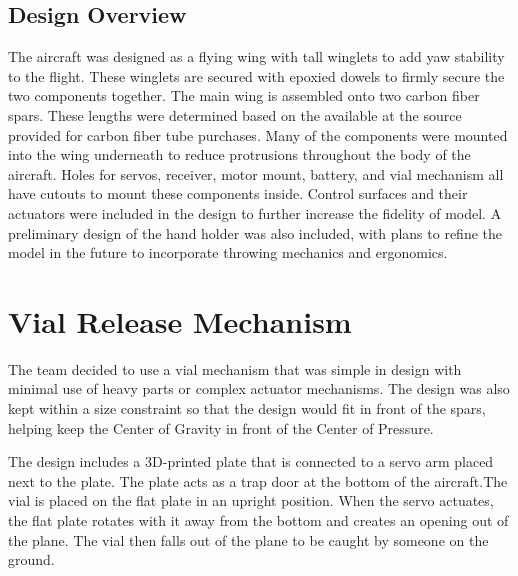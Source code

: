     
    \subsection{Design Overview}
    
        The aircraft was designed as a flying wing with tall winglets to add yaw stability to the flight. These winglets are secured with epoxied dowels to firmly secure the two components together. The main wing is assembled onto two carbon fiber spars. These lengths were determined based on the available at the source provided for carbon fiber tube purchases. Many of the components were mounted into the wing underneath to reduce protrusions throughout the body of the aircraft. Holes for servos, receiver, motor mount, battery, and vial mechanism all have cutouts to mount these components inside. Control surfaces and their actuators were included in the design to further increase the fidelity of model. A preliminary design of the hand holder was also included, with plans to refine the model in the future to incorporate throwing mechanics and ergonomics.

\section{Vial Release Mechanism}

    The team decided to use a vial mechanism that was simple in design with minimal use of heavy parts or complex actuator mechanisms. The design was also kept within a size constraint so that the design would fit in front of the spars, helping keep the Center of Gravity in front of the Center of Pressure. 
    
    The design includes a 3D-printed plate that is connected to a servo arm placed next to the plate. The plate acts as a trap door at the bottom of the aircraft.The vial is placed on the flat plate in an upright position. When the servo actuates, the flat plate rotates with it away from the bottom and creates an opening out of the plane. The vial then falls out of the plane to be caught by someone on the ground.
    
